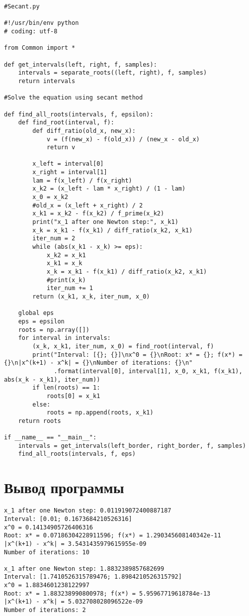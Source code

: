 \documentclass[14pt, a4paper]{article}
\begin{document}
\begin{lstlisting}
#Secant.py

#!/usr/bin/env python
# coding: utf-8

from Common import *

def get_intervals(left, right, f, samples):
    intervals = separate_roots((left, right), f, samples)
    return intervals

#Solve the equation using secant method
    
def find_all_roots(intervals, f, epsilon):
    def find_root(interval, f):
        def diff_ratio(old_x, new_x):
            v = (f(new_x) - f(old_x)) / (new_x - old_x) 
            return v
        
        x_left = interval[0]
        x_right = interval[1]
        lam = f(x_left) / f(x_right)
        x_k2 = (x_left - lam * x_right) / (1 - lam)
        x_0 = x_k2
        #old_x = (x_left + x_right) / 2
        x_k1 = x_k2 - f(x_k2) / f_prime(x_k2)
        print("x_1 after one Newton step:", x_k1)
        x_k = x_k1 - f(x_k1) / diff_ratio(x_k2, x_k1)
        iter_num = 2
        while (abs(x_k1 - x_k) >= eps):
            x_k2 = x_k1
            x_k1 = x_k
            x_k = x_k1 - f(x_k1) / diff_ratio(x_k2, x_k1)
            #print(x_k)
            iter_num += 1
        return (x_k1, x_k, iter_num, x_0)
    
    global eps
    eps = epsilon
    roots = np.array([])
    for interval in intervals:
        (x_k, x_k1, iter_num, x_0) = find_root(interval, f)
        print("Interval: [{}; {}]\nx^0 = {}\nRoot: x* = {}; f(x*) = {}\n|x^(k+1) - x^k| = {}\nNumber of iterations: {}\n"
              .format(interval[0], interval[1], x_0, x_k1, f(x_k1), abs(x_k - x_k1), iter_num))
        if len(roots) == 1:
            roots[0] = x_k1
        else:
            roots = np.append(roots, x_k1)
    return roots
    
if __name__ == "__main__":
    intervals = get_intervals(left_border, right_border, f, samples)
    find_all_roots(intervals, f, eps)
\end{lstlisting}

  \section{Вывод программы}
\begin{verbatim}
x_1 after one Newton step: 0.011919072400887187
Interval: [0.01; 0.1673684210526316]
x^0 = 0.14134905726406316
Root: x* = 0.07186304228911596; f(x*) = 1.290345608140342e-11
|x^(k+1) - x^k| = 3.5431435979615955e-09
Number of iterations: 10

x_1 after one Newton step: 1.8832389857682699
Interval: [1.7410526315789476; 1.8984210526315792]
x^0 = 1.8834601238122997
Root: x* = 1.883238990800978; f(x*) = 5.95967719618784e-13
|x^(k+1) - x^k| = 5.032708028096522e-09
Number of iterations: 2
\end{verbatim}
\end{document}
